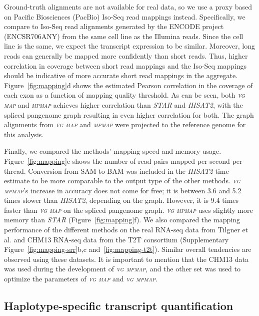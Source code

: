 \documentclass[11pt]{ucthesis}
\newcommand{\tool}[1]{\emph{\textsc{#1}}}
\begin{document}
Ground-truth alignments are not available for real data, so we use a proxy based on Pacific Biosciences (PacBio) Iso-Seq read mappings instead. Specifically, we compare to Iso-Seq read alignments generated by the ENCODE project (ENCSR706ANY) from the same cell line as the Illumina reads. Since the cell line is the same, we expect the transcript expression to be similar. Moreover, long reads can generally be mapped more confidently than short reads. Thus, higher correlation in coverage between short read mappings and the Iso-Seq mappings should be indicative of more accurate short read mappings in the aggregate. Figure~\ref{fig:mapping}d shows the estimated Pearson correlation in the coverage of each exon as a function of mapping quality threshold. As can be seen, both \tool{vg map} and \tool{mpmap} achieves higher correlation than \tool{STAR} and \tool{HISAT2}, with the spliced pangenome graph resulting in even higher correlation for both. The graph alignments from \tool{vg map} and \tool{mpmap} were projected to the reference genome for this analysis.  

Finally, we compared the methods' mapping speed and memory usage. Figure~\ref{fig:mapping}e shows the number of read pairs mapped per second per thread. Conversion from SAM to BAM was included in the \tool{HISAT2} time estimate to be more comparable to the output type of the other methods. \tool{vg mpmap}'s increase in accuracy does not come for free; it is between 3.6 and 5.2 times slower than \tool{HISAT2}, depending on the graph. However, it is 9.4 times faster than \tool{vg map} on the spliced pangenome graph. \tool{vg mpmap} uses slightly more memory than \tool{STAR} (Figure~\ref{fig:mapping}f). 
\newline 
\newline
We also compared the mapping performance of the different methods on the real RNA-seq data from Tilgner et al. \cite{tilgner2014defining} and CHM13 RNA-seq data from the T2T consortium (Supplementary Figure~\ref{fig:mapping-srr}b,c and~\ref{fig:mapping-t2t}). Similar overall tendencies are observed using these datasets. It is important to mention that the CHM13 data was used during the development of \tool{vg mpmap}, and the other set was used to optimize the parameters of \tool{vg map} and \tool{vg mpmap}.

\subsection{Haplotype-specific transcript quantification}
\end{document}
